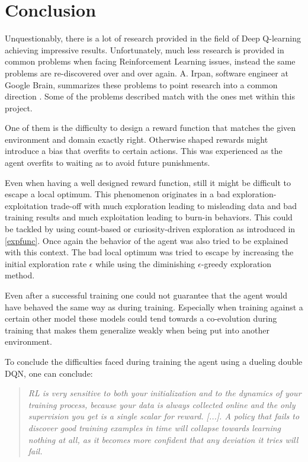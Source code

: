\section{Conclusion} \label{conclusion}


Unquestionably, there is a lot of research provided in the field of Deep Q-learning achieving impressive results. Unfortunately, much less research is provided in common problems when facing Reinforcement Learning issues, instead the same problems are re-discovered over and over again. A. Irpan, software engineer at Google Brain, summarizes these problems to point research into a common direction \cite{Irpan2018}. Some of the problems described match with the ones met within this project.

One of them is the difficulty to design a reward function that matches the given environment and domain exactly right. Otherwise shaped rewards might introduce a bias that overfits to certain actions. This was experienced as the agent overfits to waiting as to avoid future punishments. 

Even when having a well designed reward function, still it might be difficult to escape a local optimum. This phenomenon originates in a bad exploration-exploitation trade-off with much exploration leading to misleading data and bad training results and much exploitation leading to burn-in behaviors. This could be tackled by using count-based or curiosity-driven exploration as introduced in \autoref{expfunc}. Once again the behavior of the agent was also tried to be explained with this context. The bad local optimum was tried to escape by increasing the initial exploration rate $\epsilon$ while using the diminishing $\epsilon$-greedy exploration method. 

Even after a successful training one could not guarantee that the agent would have behaved the same way as during training. Especially when training against a certain other model these models could tend towards a co-evolution during training that makes them generalize weakly when being put into another environment. 

To conclude the difficulties faced during training the agent using a dueling double DQN, one can conclude: 

\begin{quote}
	\textit{\grqq[...] RL is very sensitive to both your initialization and to the dynamics of your training process, because your data is always collected online and the only supervision you get is a single scalar for reward. [...]. A policy that fails to discover good training examples in time will collapse towards learning nothing at all, as it becomes more confident that any deviation it tries will fail. \cite{Irpan2018}\grqq}
\end{quote}

